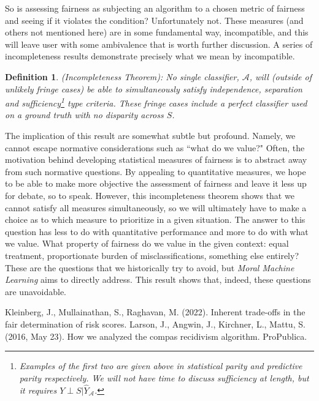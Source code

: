\documentclass[11pt]{article}
\newtheorem{definition}{Definition}
\begin{document}
 So is assessing fairness as subjecting an algorithm to a chosen metric of fairness and seeing if it violates the condition?  Unfortunately not.  These measures (and others not mentioned here) are in some fundamental way, incompatible, and this will leave user with some ambivalence that is worth further discussion.  A series of incompleteness results\cite{IT} demonstrate precisely what we mean by incompatible.  
 
\begin{definition}

\textit{(Incompleteness Theorem)}: No single classifier, $\mathcal{A}$, will (outside of unlikely fringe cases) be able to simultaneously satisfy independence, separation and sufficiency\footnote{Examples of the first two are given above in statistical parity and predictive parity respectively.  We will not have time to discuss sufficiency at length, but it requires $Y\perp S|\hat{Y}_{\mathcal{A}}$.} type criteria.  These fringe cases include a perfect classifier used on a ground truth with no disparity across $S$.  
\end{definition}

The implication of this result are somewhat subtle but profound.  Namely, we cannot escape normative considerations such as ``what do we value?"  Often, the motivation behind developing statistical measures of fairness is to abstract away from such normative questions.  By appealing to quantitative measures, we hope to be able to make more objective the assessment of fairness and leave it less up for debate, so to speak.  However, this incompleteness theorem shows that we cannot satisfy all measures simultaneously, so we will ultimately have to make a choice as to which measure to prioritize in a given situation.  The answer to this question has less to do with quantitative performance and more to do with what we value.  What property of fairness do we value in the given context: equal treatment, proportionate burden of misclassifications, something else entirely?  These are the questions that we historically try to avoid, but \textit{Moral Machine Learning} aims to directly address.  This result shows that, indeed, these questions are unavoidable.  

 
 
 \newpage
 \begin{thebibliography}{20}

 Kleinberg, J., Mullainathan, S., Raghavan, M. (2022).  Inherent trade-offs in the fair determination of risk scores.  
  Larson, J., Angwin, J., Kirchner, L., Mattu, S. (2016, May 23). How we analyzed the compas recidivism algorithm. ProPublica. 
 
  \end{thebibliography}
\end{document}
